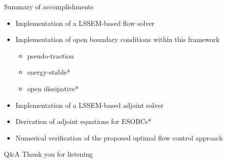 \documentclass{beamer}
\begin{document}
\begin{frame}{Summary of accomplishments}

\begin{itemize}

	\item Implementation of a LSSEM-based flow solver
	\item Implementation of open boundary conditions within this framework
	\begin{itemize}
		\item pseudo-traction
		\item energy-stable*
		\item open dissipative*
	\end{itemize}
	\item Implementation of a LSSEM-based adjoint solver
	\item Derivation of adjoint equations for ESOBCs*
	\item Numerical verification of the proposed optimal flow control approach
	

\end{itemize}

\end{frame}

\appendix

\begin{frame}{Q\&A}
    \alert{Thank you for listening}
\end{frame}
\end{document}
